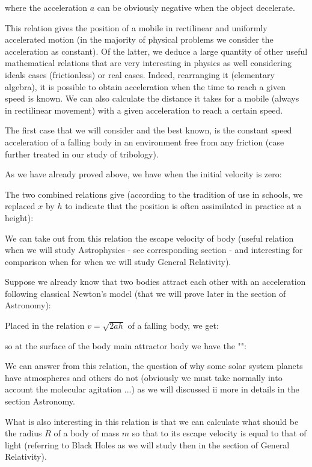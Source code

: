 	where the acceleration $a$ can be obviously negative when the object decelerate.
	
	This relation gives the position of a mobile in rectilinear and uniformly accelerated motion (in the majority of physical problems we consider the acceleration as constant). Of the latter, we deduce a large quantity of other useful mathematical relations that are very interesting in physics as well considering ideals cases (frictionless) or real cases. Indeed, rearranging it (elementary algebra), it is possible to obtain acceleration when the time to reach a given speed is known. We can also calculate the distance it takes for a mobile (always in rectilinear movement) with a given acceleration to reach a certain speed.
	
	The first case that we will consider and the best known, is the constant speed acceleration of a falling body in an environment free from any friction (case further treated in our study of tribology).
	
	As we have already proved above, we have when the initial velocity is zero:
	
	The two combined relations give (according to the tradition of use in schools, we replaced $x$ by $h$ to indicate that the position is often assimilated in practice at a height):
	
	We can take out from this relation the escape velocity of body (useful relation when we will study Astrophysics - see corresponding section - and interesting for comparison when for when we will study General Relativity).

	Suppose we already know that two bodies attract each other with an acceleration following classical Newton's model (that we will prove later in the section of Astronomy):
	
	Placed in the relation $v=\sqrt{2ah}$ of a falling body, we get:
	
	so at the surface of the body main attractor body we have the "":
	
	We can answer from this relation, the question of why some solar system planets have atmospheres and others do not (obviously we must take normally  into account the molecular agitation ...) as we will discussed ii more in details in the section Astronomy.
	
	What is also interesting in this relation is that we can calculate what should be the radius $R$ of a body of mass $m$ so that to its escape velocity is equal to that of light (referring to Black Holes as we will study then in the section of General Relativity).
	
